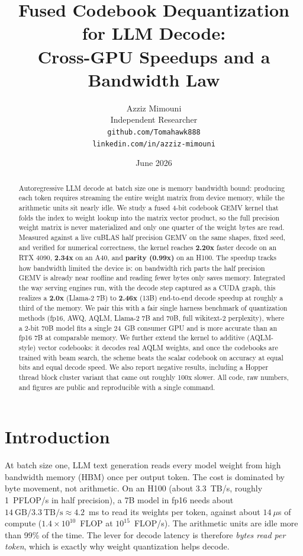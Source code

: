 \documentclass[11pt]{article}
\title{\textbf{Fused Codebook Dequantization for LLM Decode:\\
Cross-GPU Speedups and a Bandwidth Law}}
\author{Azziz Mimouni\\\small Independent Researcher\\\small \texttt{github.com/Tomahawk888}\\\small \texttt{linkedin.com/in/azziz-mimouni}}
\date{June 2026}
\begin{document}
\maketitle

\begin{abstract}
Autoregressive LLM decode at batch size one is memory bandwidth bound: producing
each token requires streaming the entire weight matrix from device memory, while
the arithmetic units sit nearly idle. We study a fused 4-bit codebook GEMV kernel
that folds the index to weight lookup into the matrix vector product, so the
full precision weight matrix is never materialized and only one quarter of the
weight bytes are read. Measured against a live cuBLAS half precision GEMV on the
same shapes, fixed seed, and verified for numerical correctness, the kernel
reaches \textbf{2.20x} faster decode on an RTX 4090, \textbf{2.34x} on an A40, and
\textbf{parity (0.99x)} on an H100. The speedup tracks how bandwidth limited the
device is: on bandwidth rich parts the half precision GEMV is already near
roofline and reading fewer bytes only saves memory. Integrated the way serving
engines run, with the decode step captured as a CUDA graph, this realizes a
\textbf{2.0x} (Llama-2 7B) to \textbf{2.46x} (13B) end-to-end decode speedup at
roughly a third of the memory. We pair this with a fair single harness benchmark of
quantization methods (fp16, AWQ, AQLM, Llama-2 7B and 70B, full wikitext-2
perplexity), where a 2-bit 70B model fits a single 24~GB consumer GPU and is more
accurate than an fp16 7B at comparable memory. We further extend the kernel to
additive (AQLM-style) vector codebooks: it decodes real AQLM weights, and once the
codebooks are trained with beam search, the scheme beats the scalar codebook on
accuracy at equal bits and equal decode speed. We also report negative results,
including a Hopper thread block cluster variant that came out roughly 100x slower. All code, raw numbers, and figures are public and
reproducible with a single command.
\end{abstract}

\section{Introduction}
At batch size one, LLM text generation reads every model weight from high
bandwidth memory (HBM) once per output token. The cost is dominated by byte
movement, not arithmetic. On an H100 (about 3.3~TB/s, roughly 1~PFLOP/s in half
precision), a 7B model in fp16 needs about $14~\text{GB} / 3.3~\text{TB/s}
\approx 4.2$~ms to read its weights per token, against about $14~\mu$s of compute
($1.4{\times}10^{10}$~FLOP at $10^{15}$~FLOP/s). The arithmetic
units are idle more than 99\% of the time. The lever for decode latency is
therefore \emph{bytes read per token}, which is exactly why weight quantization
helps decode.
\end{document}
